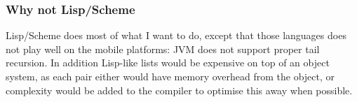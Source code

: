 \subsubsection{Why not Lisp/Scheme}
Lisp/Scheme does most of what I want to do, 
except that those languages does not play well on the mobile platforms:
JVM does not support proper tail recursion. 
In addition Lisp-like lists would be expensive on top of an object system, as each pair either would have memory overhead from the object, or complexity would be added to the compiler to optimise this away when possible.

